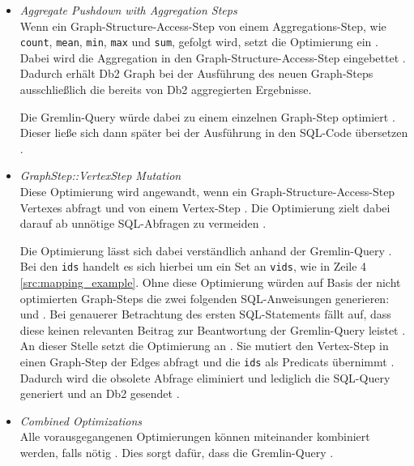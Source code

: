 \begin{itemize}
    \item \textit{Aggregate Pushdown with Aggregation Steps}\\
    Wenn ein Graph-Structure-Access-Step von einem Aggregations-Step, wie \texttt{count}, \texttt{mean}, \texttt{min}, \texttt{max} und \texttt{sum}, gefolgt wird, setzt die Optimierung ein \cite{sigmod_tian}. Dabei wird die Aggregation in den Graph-Structure-Access-Step eingebettet \cite{sigmod_tian}. Dadurch erhält Db2 Graph bei der Ausführung des neuen Graph-Steps ausschließlich die bereits von Db2 aggregierten Ergebnisse.
    
    Die Gremlin-Query  würde dabei zu einem einzelnen Graph-Step optimiert \cite{sigmod_tian}. Dieser ließe sich dann später bei der Ausführung in den SQL-Code  übersetzen \cite{sigmod_tian}.

    \item \textit{GraphStep::VertexStep Mutation}\\
    Diese Optimierung wird angewandt, wenn ein Graph-Structure-Access-Step Vertexes abfragt und von einem Vertex-Step \cite{sigmod_tian}. Die Optimierung zielt dabei darauf ab unnötige SQL-Abfragen zu vermeiden \cite{sigmod_tian}. 

    Die Optimierung lässt sich dabei verständlich anhand der Gremlin-Query  \cite{sigmod_tian}. Bei den \texttt{ids} handelt es sich hierbei um ein Set an \texttt{vids}, wie in Zeile 4 \autoref{src:mapping_example}. Ohne diese Optimierung würden auf Basis der nicht optimierten Graph-Steps die zwei folgenden SQL-Anweisungen generieren:  und  \cite{sigmod_tian}. Bei genauerer Betrachtung des ersten SQL-Statements fällt auf, dass diese keinen relevanten Beitrag zur Beantwortung der Gremlin-Query leistet \cite{sigmod_tian}. An dieser Stelle setzt die Optimierung an \cite{sigmod_tian}. Sie mutiert den Vertex-Step in einen Graph-Step der Edges abfragt und die \texttt{ids} als Predicats übernimmt \cite{sigmod_tian}. Dadurch wird die obsolete Abfrage eliminiert und lediglich die SQL-Query  generiert und an Db2 gesendet \cite{sigmod_tian}.

    \item \textit{Combined Optimizations}\\
    Alle vorausgegangenen Optimierungen können miteinander kombiniert werden, falls nötig \cite{sigmod_tian}. Dies sorgt dafür, dass die Gremlin-Query  .
\end{itemize}

